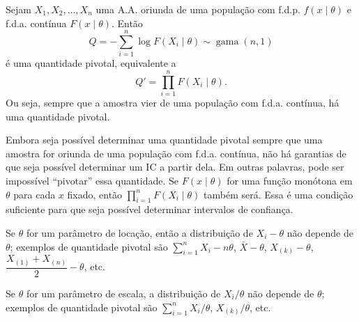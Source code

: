 \begin{theorem}
Sejam $X_1,X_2,\ldots,X_n$ uma A.A. oriunda de uma população com f.d.p. $f(x\mid\theta)$ e f.d.a. contínua $F(x\mid\theta)$. Então
\begin{equation}
Q = -\sum_{i=1}^n \log F(X_i\mid\theta) \sim \operatorname{gama}(n,1)
\end{equation}
é uma quantidade pivotal, equivalente a
\begin{equation}
Q' = \prod_{i=1}^n F(X_i\mid\theta).
\end{equation}
Ou seja, sempre que a amostra vier de uma população com f.d.a. contínua, há uma quantidade pivotal.
\end{theorem}

\begin{note}
\begin{outline}
	\1 Embora seja possível determinar uma quantidade pivotal sempre que uma amostra for oriunda de uma população com f.d.a. contínua, não há garantias de que seja possível determinar um IC a partir dela. Em outras palavras, pode ser impossível ``pivotar'' essa quantidade.
	\1 Se $F(x\mid\theta)$ for uma função monótona em $\theta$ para cada $x$ fixado, então $\prod_{i=1}^n F(X_i\mid\theta)$ também será. Essa é uma condição suficiente para que seja possível determinar intervalos de confiança.
\end{outline}
\end{note}

\begin{note}
Se $\theta$ for um parâmetro de locação, então a distribuição de $X_i-\theta$ não depende de $\theta$; exemplos de quantidade pivotal são $\sum_{i=1}^n X_i-n\theta$, $\bar{X}-\theta$, $X_{(k)}-\theta$, $\dfrac{X_{(1)}+X_{(n)}}{2}-\theta$, etc.

Se $\theta$ for um parâmetro de escala, a distribuição de $X_i/\theta$ não depende de $\theta$; exemplos de quantidade pivotal são $\sum_{i=1}^n X_i/\theta$, $X_{(k)}/\theta$, etc.
\end{note}

